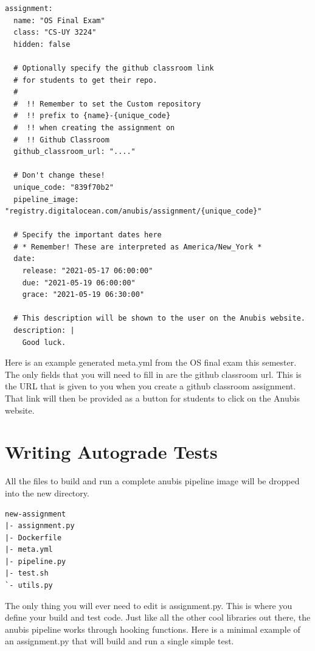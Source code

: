 \begin{verbatim}
assignment:
  name: "OS Final Exam"
  class: "CS-UY 3224"
  hidden: false

  # Optionally specify the github classroom link
  # for students to get their repo.
  #
  #  !! Remember to set the Custom repository
  #  !! prefix to {name}-{unique_code}
  #  !! when creating the assignment on
  #  !! Github Classroom
  github_classroom_url: "...."

  # Don't change these!
  unique_code: "839f70b2"
  pipeline_image: "registry.digitalocean.com/anubis/assignment/{unique_code}"

  # Specify the important dates here
  # * Remember! These are interpreted as America/New_York *
  date:
    release: "2021-05-17 06:00:00"
    due: "2021-05-19 06:00:00"
    grace: "2021-05-19 06:30:00"

  # This description will be shown to the user on the Anubis website.
  description: |
    Good luck.
\end{verbatim}

Here is an example generated meta.yml from the OS final exam this semester.
The only fields that you will need to fill in are the github classroom url.
This is the URL that is given to you when you create a github classroom assignment.
That link will then be provided as a button for students to click on the Anubis website.


\section{Writing Autograde Tests}\label{sec:writing-autograde-tests}

All the files to build and run a complete anubis pipeline image will be dropped into the new directory.

\begin{verbatim}
new-assignment
|- assignment.py
|- Dockerfile
|- meta.yml
|- pipeline.py
|- test.sh
`- utils.py
\end{verbatim}

The only thing you will ever need to edit is assignment.py.
This is where you define your build and test code.
Just like all the other cool libraries out there, the anubis pipeline works
through hooking functions.
Here is a minimal example of an assignment.py that will build and run a single simple test.

